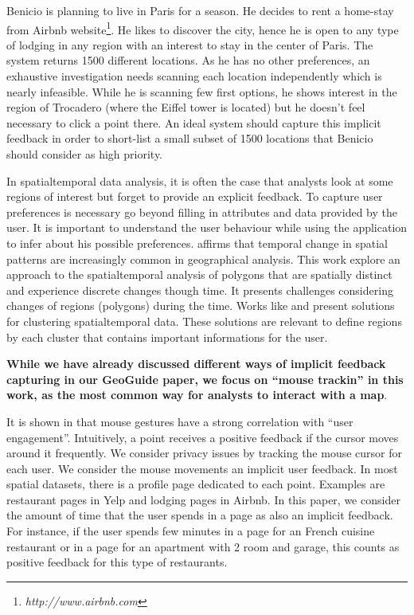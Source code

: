 \documentclass[runningheads,a4paper]{llncs}
\begin{document}
\begin{example}
\label{ex:benicio}
Benicio is planning to live in Paris for a season. He decides to rent a home-stay from Airbnb website\footnote{\it http://www.airbnb.com}. He likes to discover the city, hence he is open to any type of lodging in any region with an interest to stay in the center of Paris. The system returns 1500 different locations. As he has no other preferences, an exhaustive investigation needs scanning each location independently which is nearly infeasible. While he is scanning few first options, he shows interest in the region of Trocadero (where the Eiffel tower is located) but he doesn't feel necessary to click a point there. An ideal system should capture this implicit feedback in order to short-list a small subset of 1500 locations that Benicio should consider as high priority.
\end{example}

In spatialtemporal data analysis, it is often the case that analysts look at some regions of interest but forget to provide an explicit feedback. To capture user preferences is necessary go beyond filling in attributes and data provided by the user. It is important to understand the user behaviour while using the application to infer about his possible preferences. \cite{Robertson2007}  affirms that temporal change in spatial patterns are increasingly common in geographical analysis. This work explore an approach to the spatialtemporal analysis of polygons that are spatially distinct and experience discrete changes though time. It presents challenges considering changes of regions (polygons) during the time. Works like \cite{Ester:1996} and  \cite{Birant:2007} present solutions for clustering spatialtemporal data. These solutions are relevant to define regions by each cluster that contains important informations for the user. 

\vspace{3pt}
{\bf While we have already discussed different ways of implicit feedback capturing in our GeoGuide paper, we focus on ``mouse trackin'' in this work, as the most common way for analysts to interact with a map}.

\vspace{3pt}
It is shown in \cite{Arapakis:2014} that mouse gestures have a strong correlation with ``user engagement''. Intuitively, a point receives a positive feedback if the cursor moves around it frequently. We consider privacy issues by tracking the mouse cursor for each user. We consider the mouse movements an implicit user feedback. In most spatial datasets, there is a profile page dedicated to each point. Examples are restaurant pages in Yelp and lodging pages in Airbnb. In this paper, we consider the amount of time that the user spends in a page as also an implicit feedback. For instance, if the user spends few minutes in a page for an French cuisine restaurant or in a page for an apartment with 2 room and garage, this counts as positive feedback for this type of restaurants.
\end{document}
